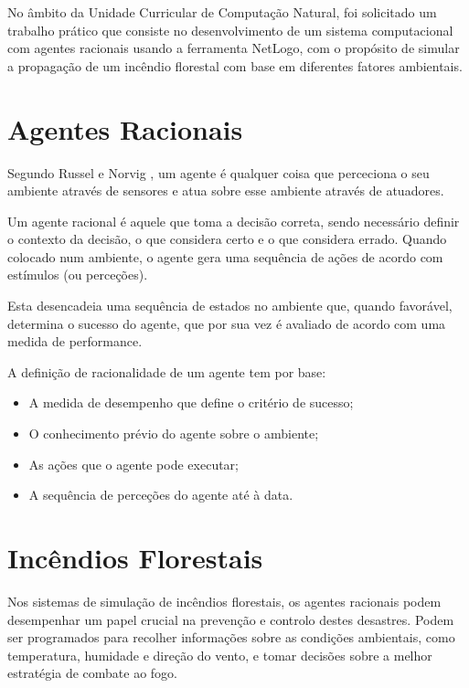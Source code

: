 No âmbito da Unidade Curricular de Computação Natural, foi solicitado um trabalho prático que consiste no desenvolvimento de um sistema computacional com agentes racionais usando a ferramenta NetLogo, com o propósito de simular a propagação de um incêndio florestal com base em diferentes fatores ambientais.

\section{Agentes Racionais}\label{sec:rational_agents}

Segundo Russel e Norvig \cite{Russel2010IntelligentAgents}, um agente é qualquer coisa que perceciona o seu ambiente através de sensores e atua sobre esse ambiente através de atuadores.

Um agente racional é aquele que toma a decisão correta, sendo necessário definir o contexto da decisão, o que considera certo e o que considera errado. Quando colocado num ambiente, o agente gera uma sequência de ações de acordo com estímulos (ou perceções). \cite{Russel2010IntelligentAgents}

Esta desencadeia uma sequência de estados no ambiente que, quando favorável, determina o sucesso do agente, que por sua vez é avaliado de acordo com uma medida de performance.

A definição de racionalidade de um agente tem por base:
\begin{itemize}
    \item A medida de desempenho que define o critério de sucesso;
    \item O conhecimento prévio do agente sobre o ambiente;
    \item As ações que o agente pode executar;
    \item A sequência de perceções do agente até à data.
\end{itemize}

\section{Incêndios Florestais}\label{sec:forest_fires}

Nos sistemas de simulação de incêndios florestais, os agentes racionais podem desempenhar um papel crucial na prevenção e controlo destes desastres. Podem ser programados para recolher informações sobre as condições ambientais, como temperatura, humidade e direção do vento, e tomar decisões sobre a melhor estratégia de combate ao fogo. 

